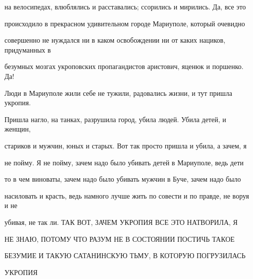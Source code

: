 на велосипедах, влюблялись и расставались; ссорились и мирились. Да, все это

происходило в прекрасном удивительном городе Мариуполе, который очевидно

совершенно не нуждался ни в каком освобождении ни от каких нациков, придуманных в

безумных мозгах укроповских пропагандистов аристович, яценюк и поршенко. Да!

Люди в Мариуполе жили себе не тужили, радовались жизни, и тут пришла укропия.

Пришла нагло, на танках, разрушила город, убила людей. Убила детей, и женщин,

стариков и мужчин, юных и старых. Вот так просто пришла и убила, а зачем, я

не пойму. Я не пойму, зачем надо было убивать детей в Мариуполе, ведь дети

то в чем виноваты, зачем надо было убивать мужчин в Буче, зачем надо было

насиловать и красть, ведь намного лучше жить по совести и по правде, не воруя и не

убивая, не так ли. ТАК ВОТ, ЗАЧЕМ УКРОПИЯ ВСЕ ЭТО НАТВОРИЛА, Я

НЕ ЗНАЮ, ПОТОМУ ЧТО РАЗУМ НЕ В СОСТОЯНИИ ПОСТИЧЬ ТАКОЕ

БЕЗУМИЕ И ТАКУЮ САТАНИНСКУЮ ТЬМУ, В КОТОРУЮ ПОГРУЗИЛАСЬ

УКРОПИЯ
